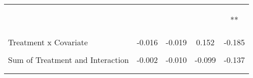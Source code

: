 \begin{tabular}{lcccc}
 & \begin{footnotesize}[0.035]\end{footnotesize} & \begin{footnotesize}[0.014]\end{footnotesize} & \begin{footnotesize}[0.208]\end{footnotesize} & \begin{footnotesize}[0.173]**\end{footnotesize}\\
\noalign{\smallskip}Treatment x Covariate & -0.016 & -0.019 & 0.152 & -0.185\\
 & \begin{footnotesize}[0.048]\end{footnotesize} & \begin{footnotesize}[0.021]\end{footnotesize} & \begin{footnotesize}[0.273]\end{footnotesize} & \begin{footnotesize}[0.248]\end{footnotesize}\\
\noalign{\smallskip}Sum of Treatment and Interaction & -0.002 & -0.010 & -0.099 & -0.137\\
 & \begin{footnotesize}[0.032]\end{footnotesize} & \begin{footnotesize}[0.014]\end{footnotesize} & \begin{footnotesize}[0.165]\end{footnotesize} & \begin{footnotesize}[0.155]\end{footnotesize}\\
\noalign{\smallskip}\hline\end{tabular}
